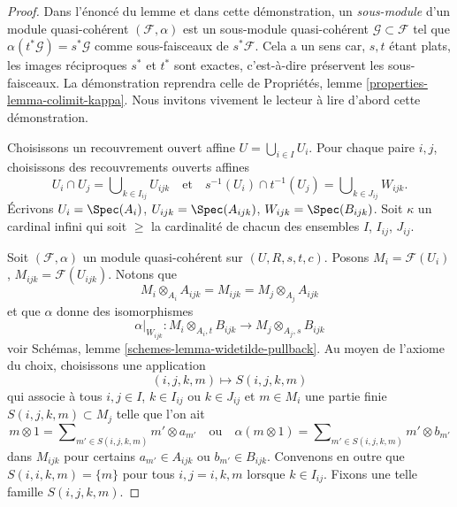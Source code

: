 \begin{proof}
Dans l'énoncé du lemme et dans cette démonstration,
un {\it sous-module} d'un module quasi-cohérent $(\mathcal{F}, \alpha)$
est un sous-module quasi-cohérent $\mathcal{G} \subset \mathcal{F}$
tel que $\alpha(t^*\mathcal{G}) = s^*\mathcal{G}$ comme sous-faisceaux de
$s^*\mathcal{F}$. Cela a un sens car, $s, t$ étant plats, les
images réciproques $s^*$ et $t^*$ sont exactes, c'est-à-dire préservent les sous-faisceaux.
La démonstration reprendra celle de
Propriétés, lemme \ref{properties-lemma-colimit-kappa}.
Nous invitons vivement le lecteur à lire d'abord cette démonstration.

\medskip\noindent
Choisissons un recouvrement ouvert affine $U = \bigcup_{i \in I} U_i$.
Pour chaque paire $i, j$, choisissons des recouvrements ouverts affines
$$
U_i \cap U_j = \bigcup\nolimits_{k \in I_{ij}} U_{ijk}
\quad\text{et}\quad
s^{-1}(U_i) \cap t^{-1}(U_j) = \bigcup\nolimits_{k \in J_{ij}} W_{ijk}.
$$
Écrivons $U_i = \Spec(A_i)$, $U_{ijk} = \Spec(A_{ijk})$,
$W_{ijk} = \Spec(B_{ijk})$.
Soit $\kappa$ un cardinal infini qui soit $\geq$ la cardinalité
de chacun des ensembles $I$, $I_{ij}$, $J_{ij}$.

\medskip\noindent
Soit $(\mathcal{F}, \alpha)$ un module quasi-cohérent sur $(U, R, s, t, c)$.
Posons $M_i = \mathcal{F}(U_i)$, $M_{ijk} = \mathcal{F}(U_{ijk})$.
Notons que
$$
M_i \otimes_{A_i} A_{ijk} = M_{ijk} = M_j \otimes_{A_j} A_{ijk}
$$
et que $\alpha$ donne des isomorphismes
$$
\alpha|_{W_{ijk}} :
M_i \otimes_{A_i, t} B_{ijk}
\longrightarrow
M_j \otimes_{A_j, s} B_{ijk}
$$
voir
Schémas, lemme \ref{schemes-lemma-widetilde-pullback}.
Au moyen de l'axiome du choix, choisissons une application
$$
(i, j, k, m) \mapsto S(i, j, k, m)
$$
qui associe à tous $i, j \in I$, $k \in I_{ij}$ ou $k \in J_{ij}$
et $m \in M_i$ une partie finie $S(i, j, k, m) \subset M_j$
telle que l'on ait
$$
m \otimes 1 = \sum\nolimits_{m' \in S(i, j, k, m)} m' \otimes a_{m'}
\quad\text{ou}\quad
\alpha(m \otimes 1) = \sum\nolimits_{m' \in S(i, j, k, m)} m' \otimes b_{m'}
$$
dans $M_{ijk}$ pour certains $a_{m'} \in A_{ijk}$ ou $b_{m'} \in B_{ijk}$.
Convenons en outre que $S(i, i, k, m) = \{m\}$ pour tous
$i, j = i, k, m$ lorsque $k \in I_{ij}$. Fixons une telle famille $S(i, j, k, m)$.


\end{proof}
